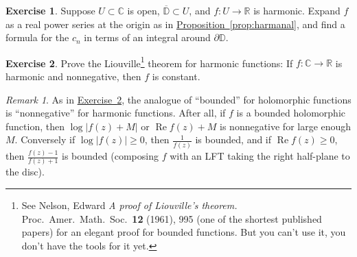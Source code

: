 \documentclass[12pt,openany]{book}
\renewcommand{\Re}{\operatorname{Re}}
\newcommand{\sabs}[1]{\lvert {#1} \rvert}
\newcommand{\C}{{\mathbb{C}}}
\newcommand{\R}{{\mathbb{R}}}
\newcommand{\D}{{\mathbb{D}}}
\newcommand{\myquote}[1]{``#1''}
\theoremstyle{plain}
\theoremstyle{remark}
\newtheorem{remark}[thm]{Remark}
\theoremstyle{definition}
\newenvironment{exbox}{%
    \def\FrameCommand{\vrule width 1pt \relax\hspace{10pt}}%
    \MakeFramed{\advance\hsize-\width\FrameRestore}%
}{%
    \endMakeFramed
}
\theoremstyle{exercise}
\newtheorem{exercise}{Exercise}[section]
\theoremstyle{example}
\newcommand{\exerciseref}[1]{\hyperref[#1]{Exercise~\ref*{#1}}}
\newcommand{\propref}[1]{\hyperref[#1]{Proposition~\ref*{#1}}}
\begin{document}
\begin{savenotes}
\begin{exbox}
\begin{exercise}
Suppose $U \subset \C$ is open, $\overline{\D} \subset U$,
and $f \colon U \to \R$ is harmonic.  Expand
$f$ as a real power series at the origin as in \propref{prop:harmanal}, and find a formula
for the $c_n$ in terms
of an integral around $\partial \D$.
\end{exercise}

\begin{exercise}\label{exercise:Liouvilleharmonic}
\pagebreak[2]
Prove the Liouville\footnote{%
See
Nelson, Edward
\emph{A proof of Liouville's theorem.}
Proc.\ Amer.\ Math.\ Soc.\ {\textbf{12}} (1961), 995
(one of the shortest published papers) for
an elegant proof for bounded functions.
But you can't use it, you don't have the
tools for it yet.} theorem for
harmonic functions:  If $f \colon \C \to \R$ is harmonic
and nonnegative, then $f$ is constant.
\end{exercise}
\end{exbox}
\end{savenotes}

\begin{remark}
As in \exerciseref{exercise:Liouvilleharmonic},
the analogue of \myquote{bounded} for holomorphic functions is
\myquote{nonnegative}
for harmonic functions.  After all, if $f$ is
a bounded holomorphic function, then $\log \sabs{f(z)+M}$ or $\Re f(z) + M$
is nonnegative for large enough $M$.  Conversely if $\log \sabs{f(z)} \geq
0$, then $\frac{1}{f(z)}$ is bounded, and if $\Re f(z) \geq 0$, then
$\frac{f(z)-1}{f(z)+1}$ is bounded (composing $f$ with an LFT taking the
right half-plane to the disc).
\end{remark}
\end{document}
